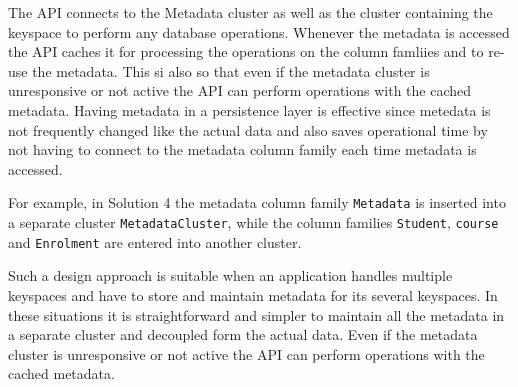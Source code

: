 The \ac{API} connects to the Metadata cluster as well as the  cluster containing the
keyspace to perform any database operations. Whenever the metadata is
accessed the \ac{API} caches it for processing the
operations on the column famliies and to re-use the metadata. This si also
so that even if the metadata cluster is unresponsive or not active the \ac{API}
can perform operations with the cached metadata. Having metadata in a
persistence layer is effective since metedata is not frequently changed like the
actual data and also saves operational time by not having to connect to the
metadata column family each time  metadata is accessed.


For example, in Solution 4 the metadata column family \texttt{Metadata} is
inserted into a separate cluster \texttt{MetadataCluster}, while the column
families \texttt{Student}, \texttt{course} and \texttt{Enrolment} are entered
into another cluster.

 Such a design approach is suitable when an application handles multiple
 keyspaces and have to store and maintain metadata for its several keyspaces. In
 these situations it is straightforward and simpler to maintain all the metadata
 in a separate cluster and decoupled form the actual data.  Even if the metadata
 cluster is unresponsive or not active the \ac{API} can perform operations with
 the cached metadata.
 
